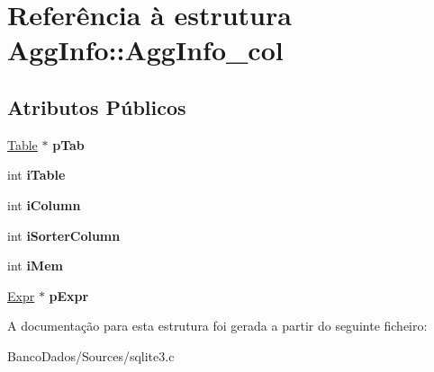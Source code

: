 \hypertarget{struct_agg_info_1_1_agg_info__col}{\section{Referência à estrutura Agg\-Info\-:\-:Agg\-Info\-\_\-col}
\label{struct_agg_info_1_1_agg_info__col}
}
\subsection*{Atributos Públicos}
\begin{DoxyCompactItemize}
\item 
\hypertarget{struct_agg_info_1_1_agg_info__col_ad2f2ae137b49e72d28a57accc9d06386}{\hyperlink{struct_table}{Table} $\ast$ {\bfseries p\-Tab}}\label{struct_agg_info_1_1_agg_info__col_ad2f2ae137b49e72d28a57accc9d06386}

\item 
\hypertarget{struct_agg_info_1_1_agg_info__col_ab49aa2fbfc6278c86b64497a6807c113}{int {\bfseries i\-Table}}\label{struct_agg_info_1_1_agg_info__col_ab49aa2fbfc6278c86b64497a6807c113}

\item 
\hypertarget{struct_agg_info_1_1_agg_info__col_a4cad2ce99ddf7425d358d49e40524f6b}{int {\bfseries i\-Column}}\label{struct_agg_info_1_1_agg_info__col_a4cad2ce99ddf7425d358d49e40524f6b}

\item 
\hypertarget{struct_agg_info_1_1_agg_info__col_ae3901ad0d5b6d519a7559358f1f7248b}{int {\bfseries i\-Sorter\-Column}}\label{struct_agg_info_1_1_agg_info__col_ae3901ad0d5b6d519a7559358f1f7248b}

\item 
\hypertarget{struct_agg_info_1_1_agg_info__col_ae22f3dfc6f9c2dc647be1b9fbd14e896}{int {\bfseries i\-Mem}}\label{struct_agg_info_1_1_agg_info__col_ae22f3dfc6f9c2dc647be1b9fbd14e896}

\item 
\hypertarget{struct_agg_info_1_1_agg_info__col_a60f23ec0abfcc88cab7083967a3abd9e}{\hyperlink{struct_expr}{Expr} $\ast$ {\bfseries p\-Expr}}\label{struct_agg_info_1_1_agg_info__col_a60f23ec0abfcc88cab7083967a3abd9e}

\end{DoxyCompactItemize}


A documentação para esta estrutura foi gerada a partir do seguinte ficheiro\-:\begin{DoxyCompactItemize}
\item 
Banco\-Dados/\-Sources/sqlite3.\-c\end{DoxyCompactItemize}
